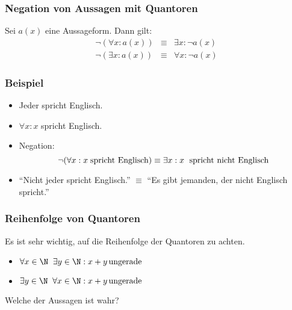 %
%
\begin{frame}\frametitle{Negation von Aussagen mit Quantoren}
	
	Sei $a(x)$ eine Aussageform. Dann gilt:
	\begin{eqnarray*}
		\neg( \forall x: a(x) ) 	&\equiv	& \exists x: \neg a(x)\\
		\neg( \exists x: a(x) )	& \equiv	& \forall x: \neg a(x)
	\end{eqnarray*}
	
\end{frame}
%
%
\begin{frame}\frametitle{Beispiel}
	
	\begin{itemize}
		\item Jeder spricht Englisch.
		\pause
		\item $\forall x: x$ spricht Englisch.
		\pause
		\item Negation: 
			$$
				\neg( \forall x: x \text{\;spricht Englisch}) \equiv \exists x : x \text{\; spricht nicht Englisch}
			$$
		\item ``Nicht jeder spricht Englisch.'' $\equiv$ ``Es gibt jemanden, der nicht Englisch spricht.'' 
	\end{itemize}
\end{frame}
%
%
\begin{frame}\frametitle{Reihenfolge von Quantoren}
	
	Es ist sehr wichtig, auf die Reihenfolge der Quantoren zu achten.
	\begin{itemize}
		\item $\forall x\in\N\;\; \exists y\in \N: x + y \text{\,ungerade}$
		\item $\exists y\in \N\;\; \forall x\in \N: x +y \text{\,ungerade}$ 
	\end{itemize}
	Welche der Aussagen ist wahr?
	
\end{frame}
%




